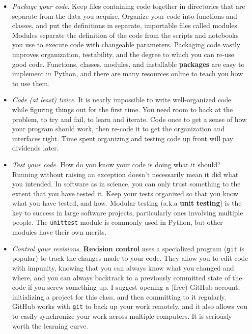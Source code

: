 \documentclass[11pt,preprint]{aastex}
\begin{document}
\begin{itemize}

\item {\it Package your code}.  Keep files containing code together in 
directories that are separate from the data you acquire.  
Organize your code into functions and classes, and put the definitions in separate, importable files called modules.  
Modules separate the definition
of the code from the scripts and notebooks you use to execute code with changeable parameters. Packaging code vastly improves
organization, testability, and the degree to which you can re-use good code. Functions, classes, modules, and installable {\bf packages}
are easy to implement in Python, and there are many resources online to teach you how to use them. 

\item {\it Code (at least) twice}. It is nearly impossible to write well-organized code while figuring
things out for the first time. You need room to hack at the problem, to try and fail, to learn and iterate.
Code once to get a sense of how your program should work, then
re-code it to get the organization and interfaces right. Time spent organizing and testing code up front will pay
dividends later.

\item {\it Test your code.} How do you know your code is doing what it should? Running
without raising an exception doesn't necessarily mean it did what you intended. In software as in science,
you can only trust something to the extent that you have tested it.
Keep your tests organized so that you know what you have tested, and how. Modular testing (a.k.a 
{\bf unit testing}) is the key to success in large
software projects, particularly ones involving multiple people. The {\tt unittest} module is 
commonly used in Python, but other modules have their own merits.

\item{\it Control your revisions}. {\bf Revision control} uses a specialized program ({\tt git} is popular) to
track the changes made to your code. They allow you to edit code with impunity, knowing that you can
always know what you changed and where, and you can always backtrack to a previously committed
state of the code if you screw something up.
I suggest opening a (free) GitHub account, initializing a project
for this class, and then committing to it regularly.  GitHub works with {\tt git} to back up your work remotely, and it also 
allows you to easily synchronize your work across multiple computers.  It is seriously worth the learning curve.

\end{itemize}
\end{document}
